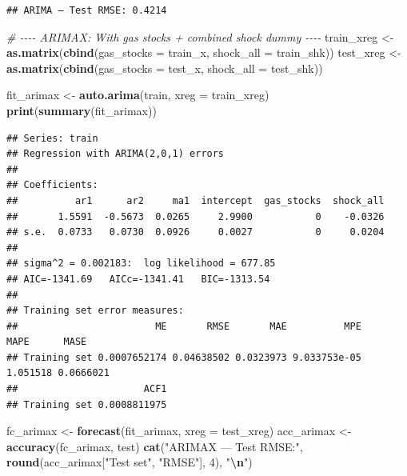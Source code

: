 \documentclass[
]{article}
\newenvironment{Shaded}{\begin{snugshade}}{\end{snugshade}}
\newcommand{\AttributeTok}[1]{\textcolor[rgb]{0.13,0.29,0.53}{#1}}
\newcommand{\CommentTok}[1]{\textcolor[rgb]{0.56,0.35,0.01}{\textit{#1}}}
\newcommand{\DecValTok}[1]{\textcolor[rgb]{0.00,0.00,0.81}{#1}}
\newcommand{\FunctionTok}[1]{\textcolor[rgb]{0.13,0.29,0.53}{\textbf{#1}}}
\newcommand{\NormalTok}[1]{#1}
\newcommand{\OtherTok}[1]{\textcolor[rgb]{0.56,0.35,0.01}{#1}}
\newcommand{\SpecialCharTok}[1]{\textcolor[rgb]{0.81,0.36,0.00}{\textbf{#1}}}
\newcommand{\StringTok}[1]{\textcolor[rgb]{0.31,0.60,0.02}{#1}}
\begin{document}
\begin{verbatim}
## ARIMA — Test RMSE: 0.4214
\end{verbatim}

\begin{Shaded}
\begin{Highlighting}[]
\CommentTok{\# {-}{-}{-}{-} ARIMAX: With gas stocks + combined shock dummy {-}{-}{-}{-}}
\NormalTok{train\_xreg }\OtherTok{\textless{}{-}} \FunctionTok{as.matrix}\NormalTok{(}\FunctionTok{cbind}\NormalTok{(}\AttributeTok{gas\_stocks =}\NormalTok{ train\_x, }\AttributeTok{shock\_all =}\NormalTok{ train\_shk))}
\NormalTok{test\_xreg  }\OtherTok{\textless{}{-}} \FunctionTok{as.matrix}\NormalTok{(}\FunctionTok{cbind}\NormalTok{(}\AttributeTok{gas\_stocks =}\NormalTok{ test\_x,  }\AttributeTok{shock\_all =}\NormalTok{ test\_shk))}

\NormalTok{fit\_arimax }\OtherTok{\textless{}{-}} \FunctionTok{auto.arima}\NormalTok{(train, }\AttributeTok{xreg =}\NormalTok{ train\_xreg)}
\FunctionTok{print}\NormalTok{(}\FunctionTok{summary}\NormalTok{(fit\_arimax))}
\end{Highlighting}
\end{Shaded}

\begin{verbatim}
## Series: train 
## Regression with ARIMA(2,0,1) errors 
## 
## Coefficients:
##          ar1      ar2     ma1  intercept  gas_stocks  shock_all
##       1.5591  -0.5673  0.0265     2.9900           0    -0.0326
## s.e.  0.0733   0.0730  0.0926     0.0027           0     0.0204
## 
## sigma^2 = 0.002183:  log likelihood = 677.85
## AIC=-1341.69   AICc=-1341.41   BIC=-1313.54
## 
## Training set error measures:
##                        ME       RMSE       MAE          MPE     MAPE      MASE
## Training set 0.0007652174 0.04638502 0.0323973 9.033753e-05 1.051518 0.0666021
##                      ACF1
## Training set 0.0008811975
\end{verbatim}

\begin{Shaded}
\begin{Highlighting}[]
\NormalTok{fc\_arimax  }\OtherTok{\textless{}{-}} \FunctionTok{forecast}\NormalTok{(fit\_arimax, }\AttributeTok{xreg =}\NormalTok{ test\_xreg)}
\NormalTok{acc\_arimax }\OtherTok{\textless{}{-}} \FunctionTok{accuracy}\NormalTok{(fc\_arimax, test)}
\FunctionTok{cat}\NormalTok{(}\StringTok{"ARIMAX — Test RMSE:"}\NormalTok{, }\FunctionTok{round}\NormalTok{(acc\_arimax[}\StringTok{"Test set"}\NormalTok{, }\StringTok{"RMSE"}\NormalTok{], }\DecValTok{4}\NormalTok{), }\StringTok{"}\SpecialCharTok{\textbackslash{}n}\StringTok{"}\NormalTok{)}
\end{Highlighting}
\end{Shaded}
\end{document}
